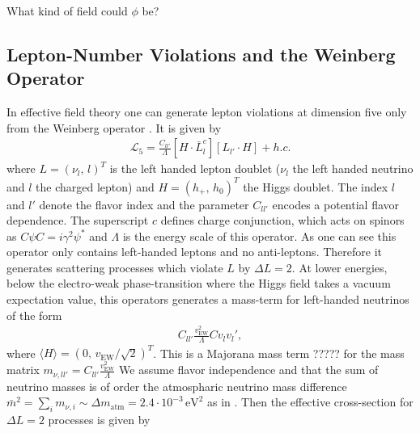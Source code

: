 \documentclass[13pt,a4paper,twoside,titlepage]{article}
\begin{document}
\noindent
What kind of field could $\phi$ be?


\subsection{Lepton-Number Violations and the Weinberg Operator}
\label{sec:lapton_number_violations}

In effective field theory one can generate lepton violations at dimension five only from the
Weinberg operator \cite{Weinberg_operator_original_PhysRevLett.43.1566}. It is given by \cite[eq. 2]{Weinberg_at_colliders_Fuks_2021}
\begin{align}
    \mathcal{L}_5 = \frac{C_{l l'}}{\Lambda} [H \cdot \bar{L}^c_l] [L_{l'} \cdot H] + h.c.
\end{align}
where $L = (\nu_l,\, l)^T$ is the left handed lepton doublet ($\nu_l$ the left handed neutrino and $l$ the charged lepton) and $H = (h_+,\, h_0)^T$ the Higgs doublet. The index $l$ and $l'$ denote the flavor index and the parameter $C_{l l'}$ encodes a potential flavor dependence.
The superscript $c$ defines charge conjunction, which acts on spinors as $C \psi C = i \gamma^2 \psi^*$
and $\Lambda$ is the energy scale of this operator.
As one can see this operator only contains left-handed leptons and no anti-leptons. Therefore
it generates scattering processes which violate $L$ by $\Delta L = 2$.
At lower energies, below the electro-weak phase-transition where the Higgs field takes a vacuum expectation value, this operators generates a mass-term for left-handed neutrinos of the form
\begin{align}
    C_{ll'} \frac{v_{\mathrm{EW}}^2}{\Lambda} C v_l v_l',
\end{align}
where $\langle H \rangle = (0,\, v_{\mathrm{EW}} / \sqrt{2})^T$.
This is a Majorana mass term ????? for the mass matrix $m_{\nu, ll'} = C_{ll'} \frac{v_{\mathrm{EW}}^2}{\Lambda}$
We assume flavor independence and that the sum of neutrino masses
is of order the atmospharic neutrino mass difference $\bar{m}^2 = \sum_i m_{\nu, i} \sim \Delta m_{\mathrm{atm}} = 2.4 \cdot 10^{-3} \, \mathrm{eV}^2$ as in \cite{Kusenko_2015_Axion_Leptogenesis}.
Then the effective cross-section for $\Delta L = 2$ processes
is given by \cite[eq. 9]{Kusenko_2015_Axion_Leptogenesis}
\end{document}
